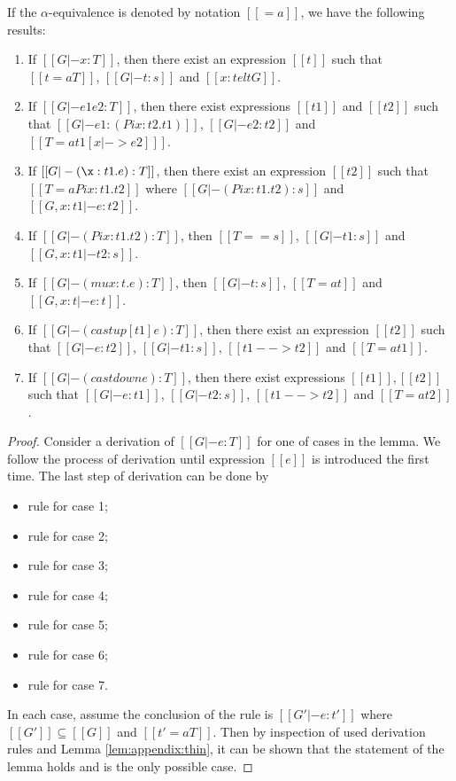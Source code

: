 \begin{lem}[Generation]\label{lem:appendix:gen}
If the $\alpha$-equivalence is denoted by notation $[[=a]]$, we have the following results:
\begin{enumerate}[(1)]
	\item If $[[G |- x:T]]$, then there exist an expression $[[t]]$ such that $[[t
=a T]]$, $[[G |- t:s]]$ and $[[x:t elt G]]$.
	\item If $[[G |- e1 e2:T]]$, then there exist expressions $[[t1]]$ and
$[[t2]]$ such that $[[G |- e1 : (Pi x:t2.t1)]]$, $[[G |- e2:t2]]$ and $[[T =a
t1[x |-> e2] ]]$.
	\item If $[[G |- (\x:t1.e):T]]$, then there exist an expression $[[t2]]$ such
that $[[T =a Pi x:t1.t2]]$ where $[[G |- (Pi x:t1.t2):s]]$ and $[[G,x:t1 |-
e:t2]]$.
    \item If $[[G |- (Pi x:t1.t2):T]]$, then $[[T == s]]$, $[[G |- t1:s]]$ and
$[[G, x:t1 |- t2:s]]$.
	\item If $[[G |- (mu x:t.e):T]]$, then $[[G |- t:s]]$, $[[T =a t]]$ and $[[G,
x:t|-e:t]]$.
	\item If $[[G |- (castup [t1] e):T]]$, then there exist an expression $[[t2]]$
such that $[[G |- e:t2]]$, $[[G |- t1:s]]$, $[[t1 --> t2]]$ and $[[T =a t1]]$.
	\item If $[[G |- (castdown e):T]]$, then there exist expressions
$[[t1]],[[t2]]$ such that $[[G |- e:t1]]$, $[[G |- t2:s]]$, $[[t1 --> t2]]$ and
$[[T =a t2]]$.
\end{enumerate}
\end{lem}

\begin{proof}
    Consider a derivation of $[[G |- e:T]]$ for one of cases in the lemma. We
follow the process of derivation until expression $[[e]]$ is introduced the
first time. The last step of derivation can be done by
    \begin{itemize}
        \item rule  for case 1;
        \item rule  for case 2;
        \item rule  for case 3;
        \item rule  for case 4;
        \item rule  for case 5;
        \item rule  for case 6;
        \item rule  for case 7.
    \end{itemize}
    In each case, assume the conclusion of the rule is $[[G' |- e : t']]$ where
$[[G']] \subseteq [[G]]$ and $[[t' =a T]]$. Then by inspection of used
derivation rules and Lemma \ref{lem:appendix:thin}, it can be shown that the
statement of the lemma holds and is the only possible case.
\end{proof}


